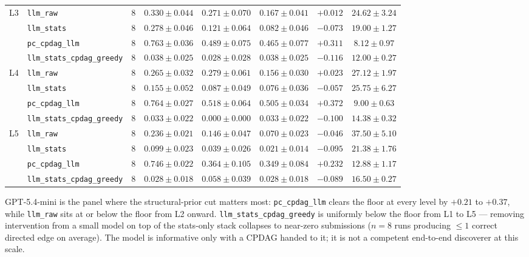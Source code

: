 \begin{center}
\begin{tabular}{@{}l l c c c c c c@{}}
\midrule
L3 & \texttt{llm\_raw}                & 8 & $0.330 \pm 0.044$ & $0.271 \pm 0.070$ & $0.167 \pm 0.041$ & $+0.012$ & $24.62 \pm 3.24$ \\
   & \texttt{llm\_stats}              & 8 & $0.278 \pm 0.046$ & $0.121 \pm 0.064$ & $0.082 \pm 0.046$ & $-0.073$ & $19.00 \pm 1.27$ \\
   & \texttt{pc\_cpdag\_llm}          & 8 & $0.763 \pm 0.036$ & $0.489 \pm 0.075$ & $0.465 \pm 0.077$ & $+0.311$ & $8.12 \pm 0.97$ \\
   & \texttt{llm\_stats\_cpdag\_greedy} & 8 & $0.038 \pm 0.025$ & $0.028 \pm 0.028$ & $0.038 \pm 0.025$ & $-0.116$ & $12.00 \pm 0.27$ \\
\midrule
L4 & \texttt{llm\_raw}                & 8 & $0.265 \pm 0.032$ & $0.279 \pm 0.061$ & $0.156 \pm 0.030$ & $+0.023$ & $27.12 \pm 1.97$ \\
   & \texttt{llm\_stats}              & 8 & $0.155 \pm 0.052$ & $0.087 \pm 0.049$ & $0.076 \pm 0.036$ & $-0.057$ & $25.75 \pm 6.27$ \\
   & \texttt{pc\_cpdag\_llm}          & 8 & $0.764 \pm 0.027$ & $0.518 \pm 0.064$ & $0.505 \pm 0.034$ & $+0.372$ & $9.00 \pm 0.63$ \\
   & \texttt{llm\_stats\_cpdag\_greedy} & 8 & $0.033 \pm 0.022$ & $0.000 \pm 0.000$ & $0.033 \pm 0.022$ & $-0.100$ & $14.38 \pm 0.32$ \\
\midrule
L5 & \texttt{llm\_raw}                & 8 & $0.236 \pm 0.021$ & $0.146 \pm 0.047$ & $0.070 \pm 0.023$ & $-0.046$ & $37.50 \pm 5.10$ \\
   & \texttt{llm\_stats}              & 8 & $0.099 \pm 0.023$ & $0.039 \pm 0.026$ & $0.021 \pm 0.014$ & $-0.095$ & $21.38 \pm 1.76$ \\
   & \texttt{pc\_cpdag\_llm}          & 8 & $0.746 \pm 0.022$ & $0.364 \pm 0.105$ & $0.349 \pm 0.084$ & $+0.232$ & $12.88 \pm 1.17$ \\
   & \texttt{llm\_stats\_cpdag\_greedy} & 8 & $0.028 \pm 0.018$ & $0.058 \pm 0.039$ & $0.028 \pm 0.018$ & $-0.089$ & $16.50 \pm 0.27$ \\
\bottomrule
\end{tabular}
\end{center}

GPT-5.4-mini is the panel where the structural-prior cut matters most: \texttt{pc\_cpdag\_llm} clears the floor at every level by $+0.21$ to $+0.37$, while \texttt{llm\_raw} sits at or below the floor from L2 onward. \texttt{llm\_stats\_cpdag\_greedy} is uniformly below the floor from L1 to L5 --- removing intervention from a small model on top of the stats-only stack collapses to near-zero submissions ($n=8$ runs producing $\le 1$ correct directed edge on average). The model is informative only with a CPDAG handed to it; it is not a competent end-to-end discoverer at this scale.

